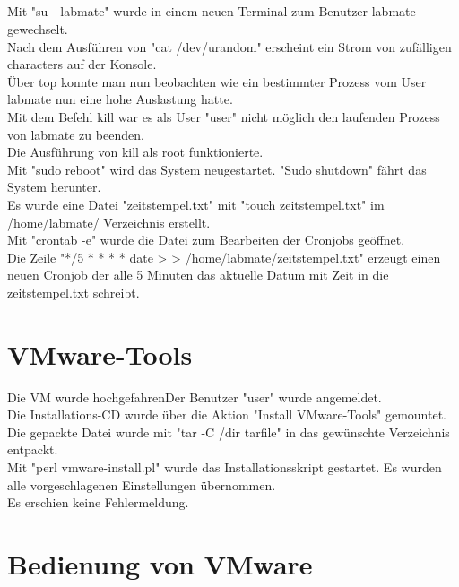 \documentclass[12pt]{article}
\theoremstyle{plain}
\begin{document}
\subsection{}
Mit "su - labmate" wurde in einem neuen Terminal zum Benutzer labmate gewechselt. \\
Nach dem Ausführen von "cat /dev/urandom" erscheint ein Strom von zufälligen characters auf der Konsole. \\
Über top konnte man nun beobachten wie ein bestimmter Prozess vom User labmate nun eine hohe Auslastung hatte. \\
Mit dem Befehl kill war es als User "user" nicht möglich den laufenden Prozess von labmate zu beenden. \\
Die Ausführung von kill als root funktionierte. \\
Mit "sudo reboot" wird das System neugestartet. "Sudo shutdown" fährt das System herunter.
\\
Es wurde eine Datei "zeitstempel.txt" mit "touch zeitstempel.txt" im /home/labmate/ Verzeichnis erstellt. \\
Mit "crontab -e" wurde die Datei zum Bearbeiten der Cronjobs geöffnet. \\
Die Zeile "*/5 * * * * date > > /home/labmate/zeitstempel.txt" erzeugt einen neuen Cronjob der alle 5 Minuten das aktuelle Datum mit Zeit in die zeitstempel.txt schreibt.

\section{VMware-Tools}
Die VM wurde hochgefahrenDer Benutzer "user" wurde angemeldet. \\
Die Installations-CD wurde über die Aktion "Install VMware-Tools" gemountet. \\
Die gepackte Datei wurde mit "tar -C /dir tarfile" in das gewünschte Verzeichnis entpackt. \\
Mit "perl vmware-install.pl" wurde das Installationsskript gestartet. Es wurden alle vorgeschlagenen Einstellungen übernommen. \\ Es erschien keine Fehlermeldung.

\section{Bedienung von VMware}
\end{document}
